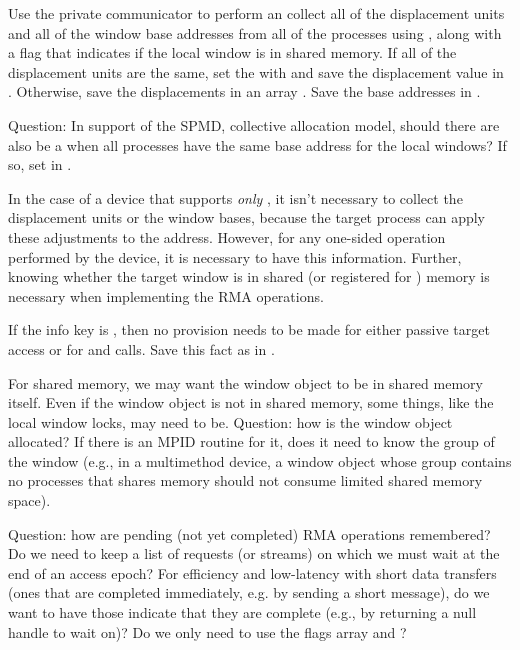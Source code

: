 \documentclass{article}
\begin{document}
Use the private communicator to perform an  
collect all of the displacement units and all of the window base
addresses from all of the processes using ,
along with a flag that indicates if the local window is in shared memory.  
If all of the displacement units are the same, set the
 with  and save
the displacement value in .  Otherwise, save the
displacements in an array .  Save the base
addresses in .  

Question:  In support of the SPMD, collective allocation model, should
there are also be a  when all processes have the same base
address for the local windows?  If so, set
 in .

In the case of a device that supports \emph{only} \tcpname, it isn't
necessary to collect the displacement units or the window bases,
because the target process can apply these adjustments to the
address.  However, for any one-sided operation performed by the device, it is
necessary to 
have this information.  Further, knowing whether the target window is
in shared (or registered for \vianame) memory is necessary when
implementing the RMA operations.

If the info key  is ,
then no provision needs to be made for either passive target access or for
 and  calls.  Save this
fact as  in .

For shared memory, we may want the window object to be in shared
memory itself.  Even if the window object is not in shared memory,
some things, like the local window locks, may need to be.  Question:
how is the window object allocated?  If there is an MPID routine for
it, does it need to know the group of the window (e.g., in a
multimethod device, a window object whose group contains no processes
that shares memory should not consume limited shared memory space).

Question: how are pending (not yet completed) RMA operations
remembered?  Do we need to keep a list of requests (or streams) on which we
must 
wait at the end of an access epoch?  For efficiency and low-latency
with short data transfers (ones that are completed immediately,
e.g. by sending a short message), do we want to have those indicate
that they are complete (e.g., by returning a null handle to wait on)?
Do we only need to use the flags array and ?
\end{document}
